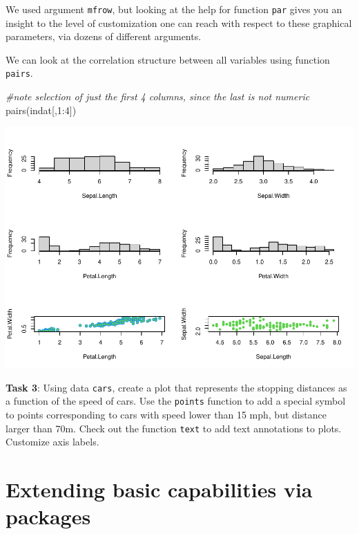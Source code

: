\documentclass[
]{article}
\newenvironment{Shaded}{\begin{snugshade}}{\end{snugshade}}
\newcommand{\CommentTok}[1]{\textcolor[rgb]{0.56,0.35,0.01}{\textit{#1}}}
\newcommand{\DecValTok}[1]{\textcolor[rgb]{0.00,0.00,0.81}{#1}}
\newcommand{\FunctionTok}[1]{\textcolor[rgb]{0.00,0.00,0.00}{#1}}
\newcommand{\NormalTok}[1]{#1}
\newcommand{\SpecialCharTok}[1]{\textcolor[rgb]{0.00,0.00,0.00}{#1}}
\begin{document}
We used argument \texttt{mfrow}, but looking at the help for function
\texttt{par} gives you an insight to the level of customization one can
reach with respect to these graphical parameters, via dozens of
different arguments.

We can look at the correlation structure between all variables using
function \texttt{pairs}.

\begin{Shaded}
\begin{Highlighting}[]
\CommentTok{\#note selection of just the first 4 columns, since the last is not numeric}
\FunctionTok{pairs}\NormalTok{(indat[,}\DecValTok{1}\SpecialCharTok{:}\DecValTok{4}\NormalTok{])}
\end{Highlighting}
\end{Shaded}

\includegraphics{TAMsIntro2RviaRStudioTutorial_files/figure-latex/unnamed-chunk-51-1.pdf}

\textbf{Task 3}: Using data \texttt{cars}, create a plot that represents
the stopping distances as a function of the speed of cars. Use the
\texttt{points} function to add a special symbol to points corresponding
to cars with speed lower than 15 mph, but distance larger than 70m.
Check out the function \texttt{text} to add text annotations to plots.
Customize axis labels.

\hypertarget{extending-basic-capabilities-via-packages}{%
\section{Extending basic capabilities via
packages}\label{extending-basic-capabilities-via-packages}}
\end{document}
